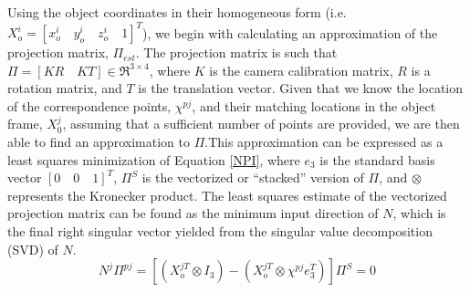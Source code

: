 \documentclass[12pt]{article}
\begin{document}
Using the object coordinates in their homogeneous form (i.e.\ $X_o^i = [x_o^i \quad y_o^i \quad z_o^i \quad 1]^T$), we begin with calculating an approximation of the projection matrix, $\Pi_{est}$. The projection matrix is such that $\Pi = [KR \quad KT] \in \Re^{3\times4}$, where $K$ is the camera calibration matrix, $R$ is a rotation matrix, and $T$ is the translation vector. Given that we know the location of the correspondence points, $\chi^{pj}$, and their matching locations in the object frame, $X_0^j$, assuming that a sufficient number of points are provided, we are then able to find an approximation to $\Pi$.This approximation can be expressed as a least squares minimization of Equation \ref{NPI}, where $e_3$ is the standard basis vector $[0 \quad 0 \quad 1]^T$, $\Pi^S$ is the vectorized or ``stacked'' version of $\Pi$, and $\otimes$ represents the Kronecker product. The least squares estimate of the vectorized projection matrix can be found as the minimum input direction of $N$, which is the final right singular vector yielded from the singular value decomposition (SVD) of $N$.  
\begin{equation}\label{NPI}
N^j\Pi^{pj} = [(X_o^{jT}\otimes I_3)-(X_o^{jT}\otimes \chi^{pj}e_3^T)]\Pi^S = 0
\end{equation}
\end{document}
